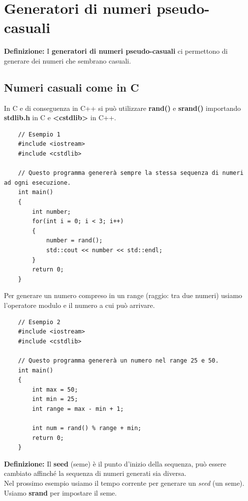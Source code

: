 
\newpage

\section{Generatori di numeri pseudo-casuali}

\textsf{\small \textbf{Definizione: } I \textbf{generatori di numeri pseudo-casuali} ci permettono di generare dei numeri che sembrano casuali. } \\

\subsection{Numeri casuali come in C}

\textsf{\small In C e di conseguenza in C++ si può utilizzare \textbf{rand()} e \textbf{srand()} importando \textbf{stdlib.h} in C e \textbf{<cstdlib>} in C++.} \\

\begin{lstlisting}
	// Esempio 1
	#include <iostream>
	#include <cstdlib>
	
	// Questo programma genererà sempre la stessa sequenza di numeri ad ogni esecuzione.
	int main()
	{
		int number;
		for(int i = 0; i < 3; i++)
		{
			number = rand();
			std::cout << number << std::endl;
		}
		return 0;
	}
\end{lstlisting}

\textsf{\small Per generare un numero compreso in un range (raggio: tra due numeri) usiamo l'operatore modulo e il numero a cui può arrivare.} \\

\begin{lstlisting}
	// Esempio 2
	#include <iostream>
	#include <cstdlib>
	
	// Questo programma genererà un numero nel range 25 e 50.
	int main()
	{
		int max = 50;
		int min = 25;
		int range = max - min + 1;
		
		int num = rand() % range + min;
		return 0;
	}
\end{lstlisting}

\textsf{\small \textbf{Definizione: } Il \textbf{seed} (seme) è il punto d'inizio della sequenza, può essere cambiato affinché la sequenza di numeri generati sia diversa.} \\

\textsf{\small Nel prossimo esempio usiamo il tempo corrente per generare un \emph{seed} (un seme). Usiamo \textbf{srand} per impostare il seme. } \\

